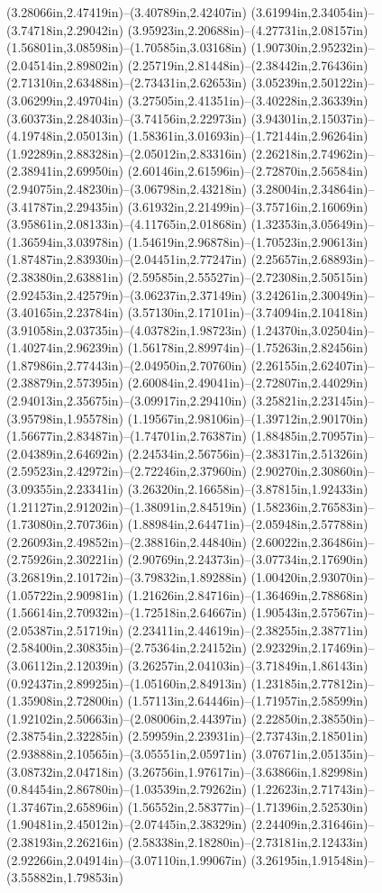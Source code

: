 (3.28066in,2.47419in)--(3.40789in,2.42407in) (3.61994in,2.34054in)--(3.74718in,2.29042in) (3.95923in,2.20688in)--(4.27731in,2.08157in) (1.56801in,3.08598in)--(1.70585in,3.03168in) (1.90730in,2.95232in)--(2.04514in,2.89802in) (2.25719in,2.81448in)--(2.38442in,2.76436in) (2.71310in,2.63488in)--(2.73431in,2.62653in) (3.05239in,2.50122in)--(3.06299in,2.49704in) (3.27505in,2.41351in)--(3.40228in,2.36339in) (3.60373in,2.28403in)--(3.74156in,2.22973in) (3.94301in,2.15037in)--(4.19748in,2.05013in) (1.58361in,3.01693in)--(1.72144in,2.96264in) (1.92289in,2.88328in)--(2.05012in,2.83316in) (2.26218in,2.74962in)--(2.38941in,2.69950in) (2.60146in,2.61596in)--(2.72870in,2.56584in) (2.94075in,2.48230in)--(3.06798in,2.43218in) (3.28004in,2.34864in)--(3.41787in,2.29435in) (3.61932in,2.21499in)--(3.75716in,2.16069in) (3.95861in,2.08133in)--(4.11765in,2.01868in) (1.32353in,3.05649in)--(1.36594in,3.03978in) (1.54619in,2.96878in)--(1.70523in,2.90613in) (1.87487in,2.83930in)--(2.04451in,2.77247in) (2.25657in,2.68893in)--(2.38380in,2.63881in) (2.59585in,2.55527in)--(2.72308in,2.50515in) (2.92453in,2.42579in)--(3.06237in,2.37149in) (3.24261in,2.30049in)--(3.40165in,2.23784in) (3.57130in,2.17101in)--(3.74094in,2.10418in) (3.91058in,2.03735in)--(4.03782in,1.98723in) (1.24370in,3.02504in)--(1.40274in,2.96239in) (1.56178in,2.89974in)--(1.75263in,2.82456in) (1.87986in,2.77443in)--(2.04950in,2.70760in) (2.26155in,2.62407in)--(2.38879in,2.57395in) (2.60084in,2.49041in)--(2.72807in,2.44029in) (2.94013in,2.35675in)--(3.09917in,2.29410in) (3.25821in,2.23145in)--(3.95798in,1.95578in) (1.19567in,2.98106in)--(1.39712in,2.90170in) (1.56677in,2.83487in)--(1.74701in,2.76387in) (1.88485in,2.70957in)--(2.04389in,2.64692in) (2.24534in,2.56756in)--(2.38317in,2.51326in) (2.59523in,2.42972in)--(2.72246in,2.37960in) (2.90270in,2.30860in)--(3.09355in,2.23341in) (3.26320in,2.16658in)--(3.87815in,1.92433in) (1.21127in,2.91202in)--(1.38091in,2.84519in) (1.58236in,2.76583in)--(1.73080in,2.70736in) (1.88984in,2.64471in)--(2.05948in,2.57788in) (2.26093in,2.49852in)--(2.38816in,2.44840in) (2.60022in,2.36486in)--(2.75926in,2.30221in) (2.90769in,2.24373in)--(3.07734in,2.17690in) (3.26819in,2.10172in)--(3.79832in,1.89288in) (1.00420in,2.93070in)--(1.05722in,2.90981in) (1.21626in,2.84716in)--(1.36469in,2.78868in) (1.56614in,2.70932in)--(1.72518in,2.64667in) (1.90543in,2.57567in)--(2.05387in,2.51719in) (2.23411in,2.44619in)--(2.38255in,2.38771in) (2.58400in,2.30835in)--(2.75364in,2.24152in) (2.92329in,2.17469in)--(3.06112in,2.12039in) (3.26257in,2.04103in)--(3.71849in,1.86143in) (0.92437in,2.89925in)--(1.05160in,2.84913in) (1.23185in,2.77812in)--(1.35908in,2.72800in) (1.57113in,2.64446in)--(1.71957in,2.58599in) (1.92102in,2.50663in)--(2.08006in,2.44397in) (2.22850in,2.38550in)--(2.38754in,2.32285in) (2.59959in,2.23931in)--(2.73743in,2.18501in) (2.93888in,2.10565in)--(3.05551in,2.05971in) (3.07671in,2.05135in)--(3.08732in,2.04718in) (3.26756in,1.97617in)--(3.63866in,1.82998in) (0.84454in,2.86780in)--(1.03539in,2.79262in) (1.22623in,2.71743in)--(1.37467in,2.65896in) (1.56552in,2.58377in)--(1.71396in,2.52530in) (1.90481in,2.45012in)--(2.07445in,2.38329in) (2.24409in,2.31646in)--(2.38193in,2.26216in) (2.58338in,2.18280in)--(2.73181in,2.12433in) (2.92266in,2.04914in)--(3.07110in,1.99067in) (3.26195in,1.91548in)--(3.55882in,1.79853in) 